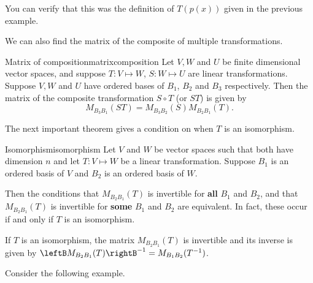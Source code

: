 \begin{solution}
You can verify that this was the definition of $T(p(x))$ given in the previous example.
\end{solution}

We can also find the matrix of the composite of multiple transformations.

\begin{theorem}{Matrix of composition}{matrixcomposition}
Let $V,W$ and $U$ be finite dimensional vector spaces, and suppose $T : V \mapsto W$, $S: W \mapsto U$ are linear transformations. 
Suppose $V, W$ and $U$ have ordered bases of $B_1$, $B_2$ and $B_3$ respectively.  Then the matrix of the composite transformation $S \circ T$ (or $ST$) is given by 
\[ M_{B_3B_1}(ST)=M_{B_3B_2}(S) M_{B_2B_1}(T).\]
\end{theorem}

The next important theorem gives a condition on when $T$ is an isomorphism.

\begin{theorem}{Isomorphism}{isomorphism}
Let $V$ and $W$ be vector spaces such that both have dimension $n$ and let $T: V \mapsto W$ be a linear transformation. Suppose $B_1$ is an ordered basis of $V$ and $B_2$ is an ordered basis of $W$. 

 Then the conditions that $M_{B_2B_1}(T)$ is invertible for \textbf{all} $B_1$ and $B_2$, and that $M_{B_2B_1}(T)$ is invertible for \textbf{some} $B_1$ and $B_2$ are equivalent. In fact, these occur if and only if $T$ is an isomorphism. 

If $T$ is an isomorphism, the matrix $M_{B_2B_1}(T)$ is invertible and its inverse is given by $\leftB M_{B_2B_1}(T) \rightB ^{-1} = M_{B_1B_2}(T^{-1})$.
\end{theorem}

Consider the following example.

